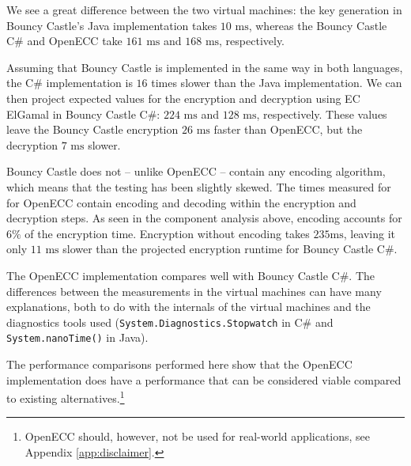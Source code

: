 We see a great difference between the two virtual machines: the key generation in Bouncy Castle's Java implementation takes
\(10 \text{ ms}\), whereas the Bouncy Castle C\# and OpenECC take \(161 \text{ ms}\) and \(168 \text{ ms}\), respectively.

Assuming that Bouncy Castle is implemented in the same way in both languages, the C\# implementation is \(16\) times slower
than the Java implementation. We can then project expected values for the encryption and decryption using EC ElGamal in Bouncy
Castle C\#: \(224 \text{ ms}\) and \(128 \text{ ms}\), respectively. These values leave the Bouncy Castle encryption \(26 \text{ ms}\)
faster than OpenECC, but the decryption \(7 \text{ ms}\) slower.

Bouncy Castle does not -- unlike OpenECC -- contain any encoding algorithm, which means that the testing has been slightly skewed.
The times measured for for OpenECC contain encoding and decoding within the encryption and decryption steps. As seen in the component
analysis above, encoding accounts for \(6\%\) of the encryption time. Encryption without encoding takes \(235 \text{ms}\), leaving it
only \(11 \text{ ms}\) slower than the projected encryption runtime for Bouncy Castle C\#.

The OpenECC implementation compares well with Bouncy Castle C\#. The differences between the measurements in the virtual machines
can have many explanations, both to do with the internals of the virtual machines and the diagnostics tools used
(\texttt{System.Diagnostics.Stopwatch} in C\# and \texttt{System.nanoTime()} in Java).

The performance comparisons performed here show that the OpenECC implementation does have a performance that can be considered viable
compared to existing alternatives.\footnote{OpenECC should, however, not be used for real-world applications, see Appendix
\ref{app:disclaimer}.}